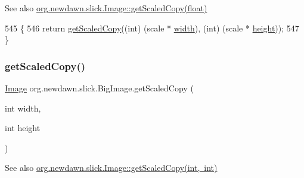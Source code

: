 \begin{DoxySeeAlso}{See also}
\mbox{\hyperlink{classorg_1_1newdawn_1_1slick_1_1_image_a833a212bc085047713ad21dc246844e9}{org.\+newdawn.\+slick.\+Image\+::get\+Scaled\+Copy(float)}} 
\end{DoxySeeAlso}

\begin{DoxyCode}
545                                             \{
546         \textcolor{keywordflow}{return} \mbox{\hyperlink{classorg_1_1newdawn_1_1slick_1_1_big_image_af08b11da9979055cdfd873e567340b1e}{getScaledCopy}}((\textcolor{keywordtype}{int}) (scale * \mbox{\hyperlink{classorg_1_1newdawn_1_1slick_1_1_image_a7d02c85e21b388428cfe5cc5c82714a1}{width}}), (\textcolor{keywordtype}{int}) (scale * 
      \mbox{\hyperlink{classorg_1_1newdawn_1_1slick_1_1_image_a54397a37823bc59ddc79ec70dc5cf226}{height}}));
547     \}
\end{DoxyCode}
\mbox{\label{classorg_1_1newdawn_1_1slick_1_1_big_image_a9c5deeeb55882b2bbb6bfe6e2ca6c106}} 
\subsubsection{\texorpdfstring{get\+Scaled\+Copy()}{getScaledCopy()}\hspace{0.1cm}{\footnotesize\ttfamily [2/2]}}
{\footnotesize\ttfamily \mbox{\hyperlink{classorg_1_1newdawn_1_1slick_1_1_image}{Image}} org.\+newdawn.\+slick.\+Big\+Image.\+get\+Scaled\+Copy (\begin{DoxyParamCaption}\item[{int}]{width,  }\item[{int}]{height }\end{DoxyParamCaption})\hspace{0.3cm}{\ttfamily [inline]}}

\begin{DoxySeeAlso}{See also}
\mbox{\hyperlink{classorg_1_1newdawn_1_1slick_1_1_image_ae5bec579000a87804bff4421c8b0d020}{org.\+newdawn.\+slick.\+Image\+::get\+Scaled\+Copy(int, int)}} 
\end{DoxySeeAlso}

